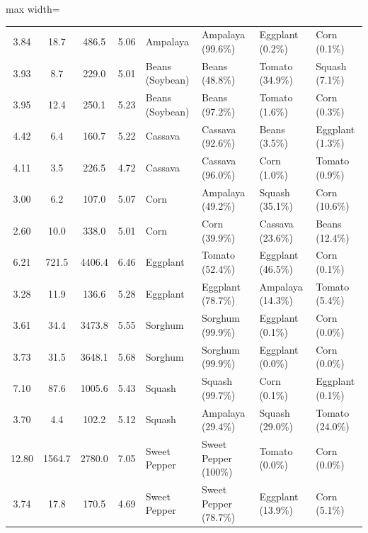 {\begin{table}[H]
\begin{adjustbox}{max width=\textwidth}
\begin{tabular}{c c c c l l l l}
			3.84 & 18.7 & 486.5 & 5.06 & Ampalaya & Ampalaya (99.6\%) & Eggplant (0.2\%) & Corn (0.1\%) \\
			
			3.93 & 8.7 & 229.0 & 5.01 & Beans (Soybean) & Beans (48.8\%) & Tomato (34.9\%) & Squash (7.1\%) \\
			
			3.95 & 12.4 & 250.1 & 5.23 & Beans (Soybean) & Beans (97.2\%) & Tomato (1.6\%) & Corn (0.3\%) \\
			
			4.42 & 6.4 & 160.7 & 5.22 & Cassava & Cassava (92.6\%) & Beans (3.5\%) & Eggplant (1.3\%) \\
			
			4.11 & 3.5 & 226.5 & 4.72 & Cassava & Cassava (96.0\%) & Corn (1.0\%) & Tomato (0.9\%) \\
			
			3.00 & 6.2 & 107.0 & 5.07 & Corn & Ampalaya (49.2\%) & Squash (35.1\%) & Corn (10.6\%) \\
			
			2.60 & 10.0 & 338.0 & 5.01 & Corn & Corn (39.9\%) & Cassava (23.6\%) & Beans (12.4\%) \\
			
			6.21 & 721.5 & 4406.4 & 6.46 & Eggplant & Tomato (52.4\%) & Eggplant (46.5\%) & Corn (0.1\%) \\
			
			3.28 & 11.9 & 136.6 & 5.28 & Eggplant & Eggplant (78.7\%) & Ampalaya (14.3\%) & Tomato (5.4\%) \\
			
			3.61 & 34.4 & 3473.8 & 5.55 & Sorghum & Sorghum (99.9\%) & Eggplant (0.1\%) & Corn (0.0\%) \\
			
			3.73 & 31.5 & 3648.1 & 5.68 & Sorghum & Sorghum (99.9\%) & Eggplant (0.0\%) & Corn (0.0\%) \\
			
			7.10 & 87.6 & 1005.6 & 5.43 & Squash & Squash (99.7\%) & Corn (0.1\%) & Eggplant (0.1\%) \\
			
			3.70 & 4.4 & 102.2 & 5.12 & Squash & Ampalaya (29.4\%) & Squash (29.0\%) & Tomato (24.0\%) \\
			
			12.80 & 1564.7 & 2780.0 & 7.05 & Sweet Pepper & Sweet Pepper (100\%) & Tomato (0.0\%) & Corn (0.0\%) \\
			
			3.74 & 17.8 & 170.5 & 4.69 & Sweet Pepper & Sweet Pepper (78.7\%) & Eggplant (13.9\%) & Corn (5.1\%) \\
			

\end{tabular}
\end{adjustbox}
\end{table}}
